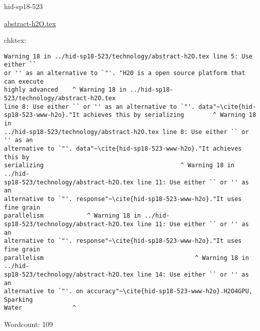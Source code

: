 \begin{IU}

hid-sp18-523

\href{https://github.com/cloudmesh-community/hid-sp18-523/blob/master//technology/abstract-h2O.tex}{abstract-h2O.tex}

 
chktex:
\begin{tiny}
\begin{verbatim}
Warning 18 in ../hid-sp18-523/technology/abstract-h2O.tex line 5: Use either ``
or '' as an alternative to `"'. "H20 is a open source platform that can execute
highly advanced    ^ Warning 18 in ../hid-sp18-523/technology/abstract-h2O.tex
line 8: Use either `` or '' as an alternative to `"'. data"~\cite{hid-
sp18-523-www-h2o}."It achieves this by serializing        ^ Warning 18 in
../hid-sp18-523/technology/abstract-h2O.tex line 8: Use either `` or '' as an
alternative to `"'. data"~\cite{hid-sp18-523-www-h2o}."It achieves this by
serializing                                      ^ Warning 18 in ../hid-
sp18-523/technology/abstract-h2O.tex line 11: Use either `` or '' as an
alternative to `"'. response"~\cite{hid-sp18-523-www-h2o}."It uses fine grain
parallelism            ^ Warning 18 in ../hid-
sp18-523/technology/abstract-h2O.tex line 11: Use either `` or '' as an
alternative to `"'. response"~\cite{hid-sp18-523-www-h2o}."It uses fine grain
parallelism                                          ^ Warning 18 in ../hid-
sp18-523/technology/abstract-h2O.tex line 14: Use either `` or '' as an
alternative to `"'. on accuracy"~\cite{hid-sp18-523-www-h2o}.H2O4GPU, Sparking
Water              ^
\end{verbatim}
\end{tiny}

Wordcount: 109

\end{IU}



